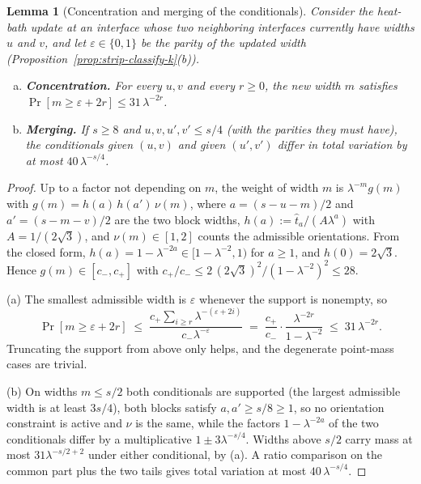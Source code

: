 \documentclass[11pt]{article}
\newtheorem{lemma}[theorem]{Lemma}
\begin{document}
\begin{lemma}[Concentration and merging of the conditionals]
\label{lem:concentration}
Consider the heat-bath update at an interface whose two neighboring
interfaces currently have widths $u$ and $v$, and let
$\varepsilon \in \{0, 1\}$ be the parity of the updated width
(Proposition~\ref{prop:strip-classify-k}(b)).
\begin{enumerate}[(a)]
  \item \textbf{Concentration.} For every $u, v$ and every $r \ge 0$,
    the new width $m$ satisfies
    $\Pr[m \ge \varepsilon + 2r] \le 31\, \lambda^{-2r}$.
  \item \textbf{Merging.} If $s \ge 8$ and $u, v, u', v' \le s/4$
    (with the parities they must have), the conditionals given $(u, v)$
    and given $(u', v')$ differ in total variation by at most
    $40\, \lambda^{-s/4}$.
\end{enumerate}
\end{lemma}

\begin{proof}
Up to a factor not depending on $m$, the weight of width $m$ is
$\lambda^{-m} g(m)$ with $g(m) = h(a)\, h(a')\, \nu(m)$, where
$a = (s - u - m)/2$ and $a' = (s - m - v)/2$ are the two block widths,
$h(a) := \hat t_a / (A \lambda^a)$ with $A = 1/(2\sqrt3)$, and
$\nu(m) \in [1, 2]$ counts the admissible orientations. From the closed
form, $h(a) = 1 - \lambda^{-2a} \in [1 - \lambda^{-2}, 1)$ for
$a \ge 1$, and $h(0) = 2\sqrt3$. Hence $g(m) \in [c_-, c_+]$ with
$c_+ / c_- \le 2\,(2\sqrt3)^2 / (1 - \lambda^{-2})^2 \le 28$.

(a) The smallest admissible width is $\varepsilon$ whenever the support
is nonempty, so
\[
  \Pr[m \ge \varepsilon + 2r]
  \;\le\; \frac{c_+ \sum_{i \ge r} \lambda^{-(\varepsilon + 2i)}}
               {c_- \lambda^{-\varepsilon}}
  \;=\; \frac{c_+}{c_-} \cdot \frac{\lambda^{-2r}}{1 - \lambda^{-2}}
  \;\le\; 31\, \lambda^{-2r} .
\]
Truncating the support from above only helps, and the degenerate
point-mass cases are trivial.

(b) On widths $m \le s/2$ both conditionals are supported (the largest
admissible width is at least $3s/4$), both blocks satisfy
$a, a' \ge s/8 \ge 1$, so no orientation constraint is active and
$\nu$ is the same, while the factors $1 - \lambda^{-2a}$ of the two
conditionals differ by a multiplicative $1 \pm 3 \lambda^{-s/4}$. Widths
above $s/2$ carry mass at most $31 \lambda^{-s/2 + 2}$ under either
conditional, by (a). A ratio comparison on the common part plus the two
tails gives total variation at most $40\, \lambda^{-s/4}$.
\end{proof}
\end{document}

